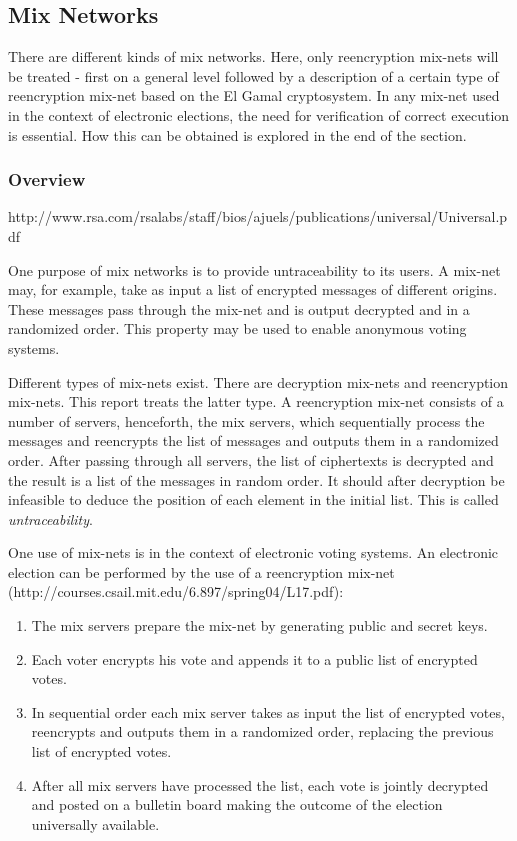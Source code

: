\subsection{Mix Networks}

There are different kinds of mix networks. Here, only reencryption
mix-nets will be treated - first on a general level followed by a
description of a certain type of reencryption mix-net based on the El
Gamal cryptosystem. In any mix-net used in the context of electronic
elections, the need for verification of correct execution is
essential. How this can be obtained is explored in the end of the
section.

\subsubsection{Overview}
http://www.rsa.com/rsalabs/staff/bios/ajuels/publications/universal/Universal.pdf

One purpose of mix networks is to provide untraceability
to its users. A mix-net may, for example, take as input a list of
encrypted messages of different origins. These messages pass through
the mix-net and is output decrypted and in a randomized order. This
property may be used to enable anonymous voting systems.

Different types of mix-nets exist. There are decryption mix-nets and
reencryption mix-nets. This report treats the latter type. A
reencryption mix-net consists of a number of servers, henceforth, the
mix servers, which sequentially process the messages and reencrypts
the list of messages and outputs them in a randomized order. After
passing through all servers, the list of ciphertexts is decrypted and
the result is a list of the messages in random order. It should after
decryption be infeasible to deduce the position of each element in the
initial list. This is called \emph{untraceability}.

One use of mix-nets is in the context of electronic voting systems. An
electronic election can be performed by the use of a reencryption
mix-net \\
(http://courses.csail.mit.edu/6.897/spring04/L17.pdf):
\begin{enumerate}
\item The mix servers prepare the mix-net by generating public and
  secret keys.
\item Each voter encrypts his vote and appends it to a public list of
  encrypted votes.
\item In sequential order each mix server takes as input the list of
  encrypted votes, reencrypts and outputs them in a randomized order,
  replacing the previous list of encrypted votes.
\item After all mix servers have processed the list, each vote is
  jointly decrypted and posted on a bulletin board making the outcome
  of the election universally available.
\end{enumerate}

